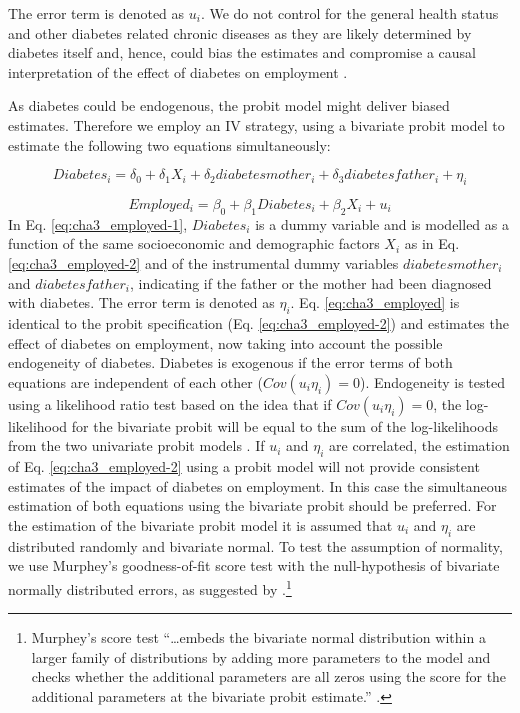 The error term is denoted as $u_{i}$. We do not control
for the general health status and other diabetes related chronic diseases
as they are likely determined by diabetes itself and, hence, could
bias the estimates and compromise a causal interpretation of the effect
of diabetes on employment \parencite{Angrist2009a}.

As diabetes could be endogenous, the probit model might
deliver biased estimates. Therefore we employ an \ac{IV} strategy,
using a bivariate probit model to estimate the following two equations
simultaneously:


\begin{equation}
Diabetes_{i}=\delta_{0}+\delta_{1}X_{i}+\delta_{2}diabetesmother_{i}+\delta_{3}diabetesfather_{i}+\eta_{i}\label{eq:cha3_employed-1}
\end{equation}



\begin{equation}
Employed_{i}=\beta_{0}+\beta_{1}Diabetes_{i}+\beta_{2}X_{i}+u_{i}\label{eq:cha3_employed}
\end{equation}
In Eq. \ref{eq:cha3_employed-1}, $Diabetes_{i}$
is a dummy variable and is modelled as a function of the same socioeconomic
and demographic factors $X_{i}$ as in Eq. \ref{eq:cha3_employed-2}
and of the instrumental dummy variables $diabetesmother_{i}$ and
$diabetesfather_{i}$, indicating if the father or the mother had
been diagnosed with diabetes. The error term is denoted as $\eta_{i}$.
Eq. \ref{eq:cha3_employed} is identical to the probit specification
(Eq. \ref{eq:cha3_employed-2}) and estimates the effect of diabetes
on employment, now taking into account the possible endogeneity of
diabetes. Diabetes is exogenous if the error terms of both equations
are independent of each other ($Cov(u_{i}\eta_{i})=0$). Endogeneity
is tested using a likelihood ratio test based on the idea that if
$Cov(u_{i}\eta_{i})=0$, the log-likelihood for the bivariate probit
will be equal to the sum of the log-likelihoods from the two univariate
probit models \parencite{Knapp1998}. If $u_{i}$ 
 and $\eta_{i}$ are correlated, the estimation of Eq. \ref{eq:cha3_employed-2}
using a probit model will not provide consistent estimates of the
impact of diabetes on employment. In this case the simultaneous estimation
of both equations using the bivariate probit should be preferred.
For the estimation of the bivariate probit model it is assumed that
$u_{i}$ 
 and $\eta_{i}$ are distributed randomly and bivariate normal. To
test the assumption of normality, we use Murphey's goodness-of-fit
score test with the null-hypothesis of bivariate normally distributed
errors, as suggested by \textcite{Chiburis2012}.\footnote{Murphey's score test ``\ldots{}embeds the bivariate normal distribution
within a larger family of distributions by adding more parameters
to the model and checks whether the additional parameters are all
zeros using the score for the additional parameters at the bivariate
probit estimate.'' \parencite[p. 19]{Chiburis2012}.}

